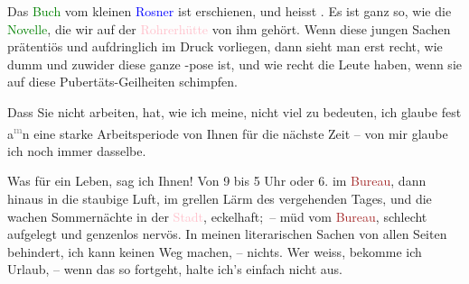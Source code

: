 \pstart
           Das \textcolor{green}{Buch}{}\ledrightnote{{$\rightarrow$}\textcolor{green}{Decadence. Novelletten}} vom kleinen \textcolor{blue}{Rosner}{}\ledrightnote{\textcolor{blue}{Karl Peter Rosner}} ist erschienen, und heisst \label{K_L03123-4v}\label{K_L03123-4h}. Es ist ganz so, wie die \textcolor{green}{Novelle}{}\ledrightnote{{$\rightarrow$}\textcolor{green}{Straßenliebe}}, die {\pb}wir \label{K_L03123-5v}\label{K_L03123-5h} auf der \textcolor{pink}{Rohrerhütte}{}\ledrightnote{\textcolor{pink}{Rohrerhütte}} von ihm gehört. Wenn
               diese jungen Sachen prätentiös und aufdringlich im Druck vorliegen, dann sieht man
               erst recht, wie dumm und zuwider diese ganze \label{K_L03123-6v}\label{K_L03123-6h}-pose ist, und wie recht die Leute haben, wenn sie auf diese
               Pubertäts-Geilheiten schimpfen.\pend
           
\pstart
           Dass Sie nicht arbeiten, hat, wie ich meine, nicht viel zu bedeuten, ich glaube fest a\substVorne{}\textsuperscript{\textcolor{gray}{m}}\substDazwischen{}n\substHinten{} eine starke Arbeitsperiode von Ihnen für die nächste Zeit – von mir glaube
               ich noch immer dasselbe.\pend
           
\pstart
           Was für ein Leben, sag ich Ihnen! Von 9 bis 5 Uhr oder 6. im \textcolor{brown}{Bureau}{}\ledrightnote{{$\rightarrow$}\textcolor{brown}{»Phönix« Versicherung}}, dann hinaus in die staubige Luft,
               im grellen Lärm des vergehenden Tages, und die wachen Sommernächte in der \textcolor{pink}{Stadt}{}\ledrightnote{{$\rightarrow$}\textcolor{pink}{Wien}}, eckelhaft; – müd vom \textcolor{brown}{Bureau}{}\ledrightnote{{$\rightarrow$}\textcolor{brown}{»Phönix« Versicherung}}, schlecht aufgelegt und
               genzenlos nervös. In meinen literarischen Sachen von {\pb}allen Seiten behindert,
               ich kann keinen Weg machen, – nichts. Wer weiss, bekomme ich Urlaub, – wenn das so
               fortgeht, halte ich’s einfach nicht aus.\pend
           

